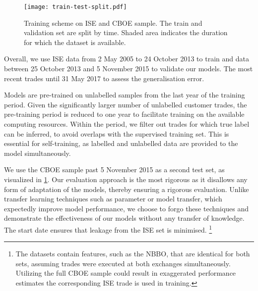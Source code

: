 \begin{figure}[ht]
    \centering
    \texttt{[image: train-test-split.pdf]}
    \caption[Training scheme on  and  Sample]{Training scheme on \gls{ISE} and \gls{CBOE} sample. The train and validation set are split by time. Shaded area  indicates the duration for which the dataset is available.}
    \label{fig:train-test-split}
\end{figure}

Overall, we use \gls{ISE} data from 2 May 2005 to 24 October 2013 to train and data between 25 October 2013 and 5 November 2015 to validate our models. The most recent trades until 31 May 2017 to assess the generalisation error.

Models are pre-trained on unlabelled samples from the last year of the training period. Given the significantly larger number of unlabelled customer trades, the pre-training period is reduced to one year to facilitate training on the available computing resources. Within the period, we filter out trades for which true label can be inferred, to avoid overlaps with the supervised training set. This is essential for self-training, as labelled and unlabelled data are provided to the model simultaneously.

We use the \gls{CBOE} sample past 5 November 2015 as a second test set, as visualized in \cref{fig:train-test-split}. Our evaluation approach is the most rigorous as it disallows any form of adaptation of the models, thereby ensuring a rigorous evaluation. Unlike transfer learning techniques such as parameter or model transfer, which expectedly improve model performance, we choose to forgo these techniques and demonstrate the effectiveness of our models without any transfer of knowledge. The start date ensures that leakage from the \gls{ISE} set is minimised. \footnote{The datasets contain features, such as the \gls{NBBO}, that are identical for both sets, assuming trades were executed at both exchanges simultaneously. Utilizing the full \gls{CBOE} sample could result in exaggerated performance estimates the corresponding \gls{ISE} trade is used in training.}

